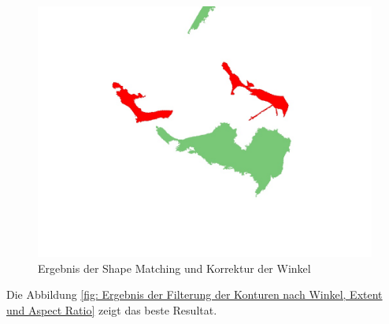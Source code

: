 \begin{figure}[H]
	\center
	\includegraphics[scale=0.43]{Grafiken/entwicklung/32BlankFilteredBySimilarity.jpg}
	\caption{Ergebnis der Shape Matching und Korrektur der Winkel} 
	\label{fig: Ergebnis der Shape Matching und Korrektur der Winkel} 
\end{figure}


Die Abbildung \ref{fig: Ergebnis der Filterung der Konturen nach Winkel, Extent und Aspect Ratio} zeigt das beste Resultat.
